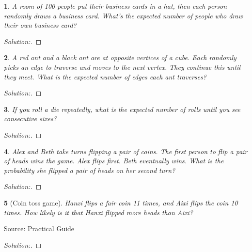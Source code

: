 \documentclass[10pt]{report}
\newtheorem{exe}{}[chapter]
\newenvironment{sol}{\begin{proof}[Solution:]}{\end{proof}}
\begin{document}
\begin{exe}
A room of 100 people put their business cards in a hat, then each person randomly draws a business card. What's the expected number of people who draw their own business card?
\end{exe}
\begin{teacher}
\begin{sol}
\end{sol}
\end{teacher}

\begin{exe}
A red ant and a black ant are at opposite vertices of a cube. Each randomly picks an edge to traverse and moves to the next vertex. They continue this until they meet. What is the expected number of edges each ant traverses?
\end{exe}
\begin{teacher}
\begin{sol}
\end{sol}
\end{teacher}

\begin{exe}
If you roll a die repeatedly, what is the expected number of rolls until you see consecutive sixes?
\end{exe}
\begin{teacher}
\begin{sol}
\end{sol}
\end{teacher}

\begin{exe}
Alex and Beth take turns flipping a pair of coins. The first person to flip a pair of heads wins the game. Alex flips first. Beth eventually wins. What is the probability she flipped a pair of heads on her second turn?
\end{exe}
\begin{teacher}
\begin{sol}
\end{sol}
\end{teacher}

\begin{exe}[Coin toss game]
Hanxi flips a fair coin 11 times, and Aixi flips the coin 10 times. How likely is it that Hanxi flipped more heads than Aixi?
\end{exe}
\begin{teacher}
Source: Practical Guide
\begin{sol}
\end{sol}
\end{teacher}
\end{document}
